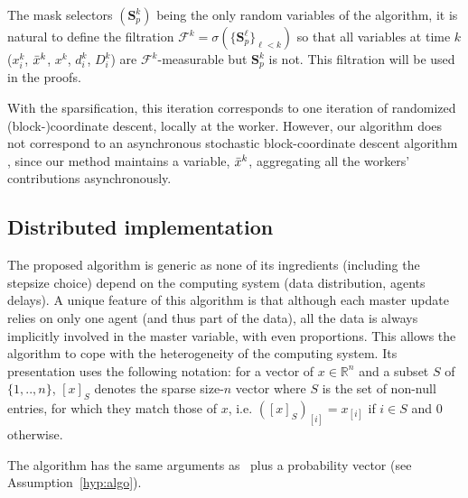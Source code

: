 The mask selectors $(\mathbf{S}_p^k)$ being the only random variables of the algorithm,  it is natural to define the filtration $\mathcal{F}^k = \sigma( \{\mathbf{S}_p^\ell\}_{\ell<k} )$ so that all variables at time $k$ ($x_i^k$, $\bar{x}^k$, $x^k$, $d_i^k$, $D_i^k$) are $\mathcal{F}^k$-measurable but $\mathbf{S}_p^k$ is not. This filtration will be used in the proofs.



With the sparsification, this iteration corresponds to one iteration of randomized (block-)coordinate descent, locally at the worker. However, our algorithm does not correspond to an asynchronous stochastic block-coordinate descent algorithm \cite{liu2015asynchronous,sun2017asynchronous,peng2016arock,richtarik2016distributed}, since our method maintains a variable, $\bar{x}^k$, aggregating all the workers' contributions asynchronously.



\subsection{Distributed implementation}\label{sec:distributed-sparse-impl}


The proposed algorithm \salgo is generic as none of its ingredients (including the stepsize choice) depend on the computing system  (data distribution, agents delays). A unique feature of this algorithm is that although each master update relies on only one agent (and thus part of the data), all the data is always implicitly involved in the master variable, with even proportions. This allows the algorithm to cope with the heterogeneity of the computing system. Its presentation uses the following notation:
for a vector of $x\in\mathbb{R}^n$ and a subset $S$ of $\{1,..,n\}$, $[x]_{S}$ denotes the sparse size-$n$ vector where $S$ is the set of non-null entries, for which they match those of $x$, i.e. $([x]_{S})_{[i]} = x_{[i]}$ if $i\in S$ and $0$ otherwise.

The algorithm \salgo has the same arguments as \dave~plus a probability vector (see Assumption~\ref{hyp:algo}).


